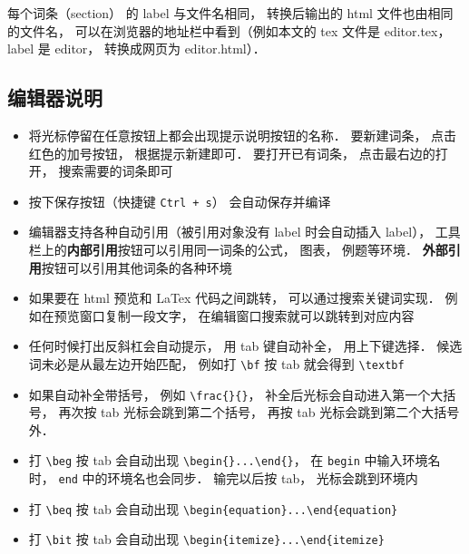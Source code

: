 每个词条（section） 的 label 与文件名相同， 转换后输出的 html 文件也由相同的文件名， 可以在浏览器的地址栏中看到（例如本文的 tex 文件是 editor.tex， label 是 editor， 转换成网页为 editor.html）．

\subsection{编辑器说明}
\begin{itemize}
\item 将光标停留在任意按钮上都会出现提示说明按钮的名称． 要新建词条， 点击红色的加号按钮， 根据提示新建即可． 要打开已有词条， 点击最右边的打开， 搜索需要的词条即可

\item 按下保存按钮（快捷键 \lstinline|Ctrl + s|） 会自动保存并编译

\item 编辑器支持各种自动引用（被引用对象没有 label 时会自动插入 label）， 工具栏上的\textbf{内部引用}按钮可以引用同一词条的公式， 图表， 例题等环境． \textbf{外部引用}按钮可以引用其他词条的各种环境

\item 如果要在 html 预览和 LaTex 代码之间跳转， 可以通过搜索关键词实现． 例如在预览窗口复制一段文字， 在编辑窗口搜索就可以跳转到对应内容

\item 任何时候打出反斜杠会自动提示， 用 tab 键自动补全， 用上下键选择． 候选词未必是从最左边开始匹配， 例如打 \lstinline|\bf| 按 tab 就会得到 \lstinline|\textbf|

\item 如果自动补全带括号， 例如 \lstinline|\frac{}{}|， 补全后光标会自动进入第一个大括号， 再次按 tab 光标会跳到第二个括号， 再按 tab 光标会跳到第二个大括号外．

\item 打 \lstinline|\beg| 按 tab 会自动出现 \lstinline|\begin{}...\end{}|， 在 \lstinline|begin| 中输入环境名时， \lstinline|end| 中的环境名也会同步． 输完以后按 tab， 光标会跳到环境内

\item 打 \lstinline|\beq| 按 tab 会自动出现 \lstinline|\begin{equation}...\end{equation}|

\item 打 \lstinline|\bit| 按 tab 会自动出现 \lstinline|\begin{itemize}...\end{itemize}|
\end{itemize}


